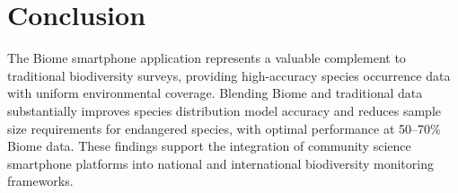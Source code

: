 \documentclass[11pt]{article}
\begin{document}
\section{Conclusion}

The Biome smartphone application represents a valuable complement to traditional biodiversity surveys, providing high-accuracy species occurrence data with uniform environmental coverage. Blending Biome and traditional data substantially improves species distribution model accuracy and reduces sample size requirements for endangered species, with optimal performance at 50--70\% Biome data. These findings support the integration of community science smartphone platforms into national and international biodiversity monitoring frameworks.



\end{document}
